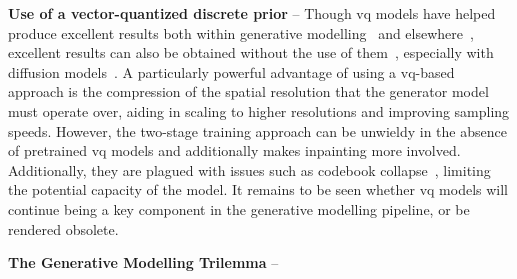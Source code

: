 \textbf{Use of a vector-quantized discrete prior} -- 
Though \gls{vq} models have helped produce excellent results both within
generative
modelling~\cite{razavi2019generating,esser2021taming,bondtaylor2021unleashing,rombach2021highresolution,ramesh2021dalle,yu2021vqgan,lee2022rqvae}
and elsewhere~\cite{zeghidour2021soundstream}, excellent results can also be
obtained without the use of
them~\cite{child2020vqvae,arash2020nvae,hazami2022efficient}, especially with
diffusion
models~\cite{song2019sbm,song2020sde,dhariwal2021ddpm,song2021mlt,xiao2021trilemma,vahdat2021sbmlatent,martineau2021fast,dockhorn2021langevin}.
A particularly powerful advantage of using a \gls{vq}-based approach is the
compression of the spatial resolution that the generator model must operate
over, aiding in scaling to higher resolutions and improving sampling speeds.
However, the two-stage training approach can be unwieldy in the absence of
pretrained \gls{vq} models and additionally makes inpainting more involved.
Additionally, they are plagued with issues such as codebook
collapse~\cite{esser2021taming,bondtaylor2021unleashing,yu2021vqgan}, limiting
the potential capacity of the model. It remains to be seen whether \gls{vq}
models will continue being a key component in the generative modelling pipeline,
or be rendered obsolete.

\textbf{The Generative Modelling Trilemma} -- 

